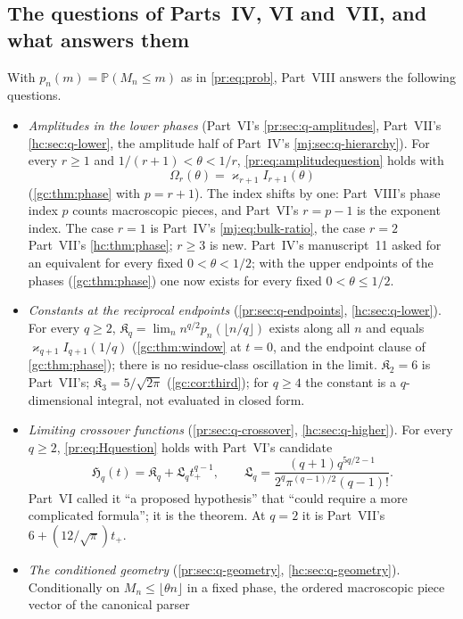 \documentclass[11pt,a4paper]{article}
\theoremstyle{definition}\newaliascnt{definition}{theorem}
\theoremstyle{remark}\newaliascnt{remark}{theorem}
\newcommand{\ljP}{\mathbb P}
\begin{document}
\subsection{The questions of Parts~IV, VI and~VII, and what answers them}
\label{gc:sec:answer}
With $p_n(m)=\ljP(M_n\le m)$ as in \eqref{pr:eq:prob}, Part~VIII answers the
following questions.
\begin{itemize}
\item \emph{Amplitudes in the lower phases} (Part~VI's
 \cref{pr:sec:q-amplitudes}, Part~VII's \cref{hc:sec:q-lower}, the amplitude
 half of Part~IV's \cref{mj:sec:q-hierarchy}). For every $r\ge1$ and
 $1/(r+1)<\theta<1/r$, \eqref{pr:eq:amplitudequestion} holds with
 \[
  \Omega_r(\theta)=\varkappa_{r+1}I_{r+1}(\theta)
 \]
 (\cref{gc:thm:phase} with $p=r+1$). The index shifts by one: Part~VIII's
 phase index $p$ counts macroscopic pieces, and Part~VI's $r=p-1$ is the
 exponent index. The case $r=1$ is Part~IV's \eqref{mj:eq:bulk-ratio}, the
 case $r=2$ Part~VII's \cref{hc:thm:phase}; $r\ge3$ is new. Part~IV's
 manuscript~11 asked for an equivalent for every fixed $0<\theta<1/2$; with
 the upper endpoints of the phases (\cref{gc:thm:phase}) one now exists for
 every fixed $0<\theta\le1/2$.
\item \emph{Constants at the reciprocal endpoints} (\cref{pr:sec:q-endpoints},
 \cref{hc:sec:q-lower}). For every $q\ge2$,
 $\mathfrak K_q=\lim_nn^{q/2}p_n(\lfloor n/q\rfloor)$ exists along all $n$ and
 equals $\varkappa_{q+1}I_{q+1}(1/q)$ (\cref{gc:thm:window} at $t=0$, and the
 endpoint clause of \cref{gc:thm:phase}); there is no residue-class
 oscillation in the limit. $\mathfrak K_2=6$ is Part~VII's;
 $\mathfrak K_3=5/\sqrt{2\pi}$ (\cref{gc:cor:third}); for $q\ge4$ the
 constant is a $q$-dimensional integral, not evaluated in closed form.
\item \emph{Limiting crossover functions} (\cref{pr:sec:q-crossover},
 \cref{hc:sec:q-higher}). For every $q\ge2$, \eqref{pr:eq:Hquestion} holds with
 Part~VI's candidate
 \[
  \mathfrak H_q(t)=\mathfrak K_q+\mathfrak L_qt_+^{q-1},\qquad
  \mathfrak L_q=\frac{(q+1)q^{5q/2-1}}{2^q\pi^{(q-1)/2}(q-1)!}.
 \]
 Part~VI called it ``a proposed hypothesis'' that ``could require a more
 complicated formula''; it is the theorem. At $q=2$ it is Part~VII's
 $6+(12/\sqrt\pi)t_+$.
\item \emph{The conditioned geometry} (\cref{pr:sec:q-geometry},
 \cref{hc:sec:q-geometry}). Conditionally on $M_n\le\lfloor\theta n\rfloor$ in
 a fixed phase, the ordered macroscopic piece vector of the canonical parser

\end{itemize}
\end{document}
